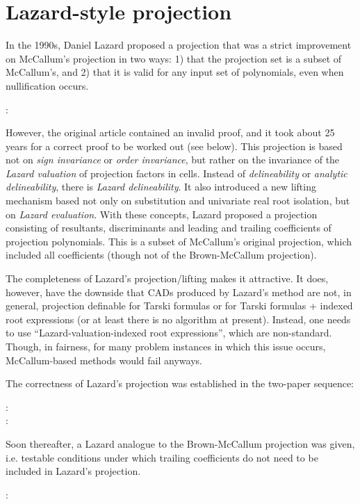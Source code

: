 \documentclass{article}
\begin{document}
\section{Lazard-style projection}
In the 1990s, Daniel Lazard proposed a projection that was a strict
improvement on McCallum's projection in two ways: 1) that the
projection set is a subset of McCallum's, and 2) that it is valid for
any input set of polynomials, even when nullification occurs.
%
\begin{description}
\item[\autocite{Lazard:94} :]  
\end{description}
%
However, the original article contained an invalid proof, and it
took about 25 years for a correct proof to be worked out (see below).
This projection is based not on \emph{sign invariance} or
\emph{order invariance}, but rather on the invariance of the
\emph{Lazard valuation} of projection factors in cells.
Instead of \emph{delineability} or \emph{analytic delineability},
there is \emph{Lazard delineability}.  It also introduced a new
lifting mechanism based not only on substitution and univariate real
root isolation, but on \emph{Lazard evaluation}.  With these concepts,
Lazard proposed a projection consisting of
resultants, discriminants and leading and trailing coefficients of
projection polynomials.  This is a subset of McCallum's original
projection, which included all coefficients (though not of the
Brown-McCallum projection).

The completeness of Lazard's projection/lifting makes it attractive.
It does, however, have the downside that CADs produced by Lazard's
method are not, in general, projection definable for Tarski formulas
or for Tarski formulas + indexed root expressions (or at least there
is no algorithm at present).  Instead, one needs to use
``Lazard-valuation-indexed root expressions'', which are non-standard.
Though, in fairness, for many problem instances in which this issue
occurs, McCallum-based methods would fail anyways.

The correctness of Lazard's projection was established in the
two-paper sequence:
%
\begin{description}
\item[\autocite{McCallumHong2016} :]  
\item[\autocite{McCallumEtAl:2019} :]  
\end{description}
%
Soon thereafter, a Lazard analogue to the Brown-McCallum projection
was given, i.e. testable conditions under which trailing
coefficients do not need to be included in Lazard's projection.
%
\begin{description}
\item[\autocite{BrownMcCallum:2020} :]  
\end{description}
%
\end{document}
